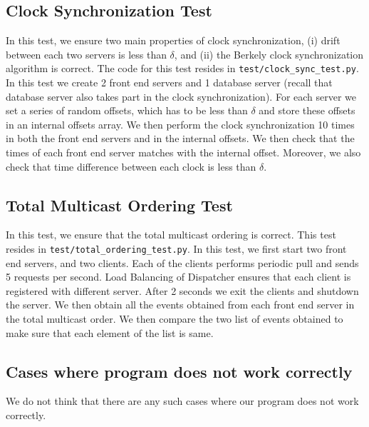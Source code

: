 \documentclass{article}
\begin{document}
\subsection{Clock Synchronization Test}
In this test, we ensure two main properties of clock synchronization, 
(i) drift between each two servers is less than $\delta$, and (ii) the 
Berkely clock synchronization algorithm is correct. The code for this test
resides in \texttt{test/clock\_sync\_test.py}. In this test we create 2 front
end servers and 1 database server (recall that database server also takes
part in the clock synchronization). For each server we set a series of random
offsets, which has to be less than $\delta$ and store these offsets 
in an internal offsets array. We then perform the clock synchronization
10 times in both the front end servers and in the internal offsets. 
We then check that the times of each front end server matches with the internal
offset. Moreover, we also check that time difference between each clock is
less than $\delta$.

\subsection{Total Multicast Ordering Test}
In this test, we ensure that the total multicast ordering is correct.
This test resides in \texttt{test/total\_ordering\_test.py}. In this test, we
first start two front end servers, and two clients. Each of the clients performs
periodic pull and sends 5 requests per second. Load Balancing of Dispatcher
ensures that each client is registered with different server. After 2 seconds
we exit the clients and shutdown the server. We then obtain all the events
obtained from each front end server in the total multicast order. We then
compare the two list of events obtained to make sure that each element of the 
list is same.


\subsection{Cases where program does not work correctly}
We do not think that there are any such cases where our program does not work
correctly.
\end{document}
